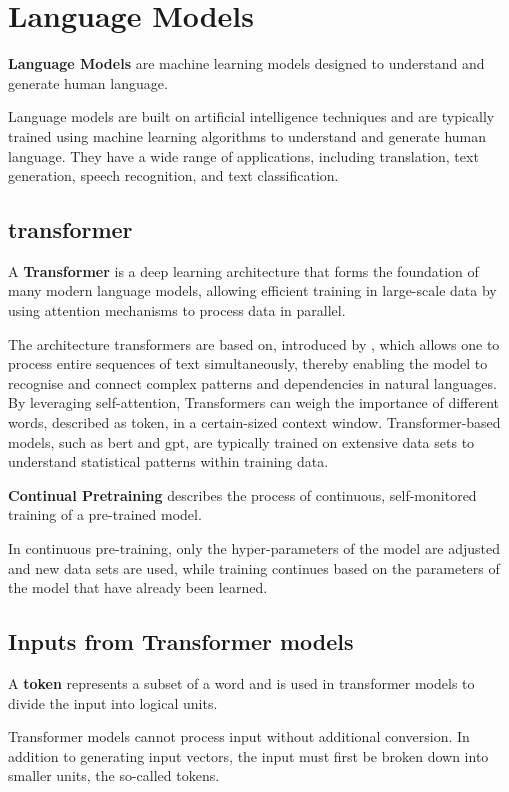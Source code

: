 \section{Language Models}\label{sec:language-models}

\begin{definition}\label{def:language-models}
    \textbf{Language Models} are machine learning models designed to understand and generate human language.
\end{definition}
Language models are built on artificial intelligence techniques and are typically trained using machine learning algorithms to understand and generate human language. 
They have a wide range of applications, including translation, text generation, speech recognition, and text classification.
\subsection{transformer}\label{transformer}

\begin{definition}\label{def:transformer}
    A \textbf{Transformer} is a deep learning architecture that forms the foundation of many modern language models, allowing efficient training in large-scale data by using attention mechanisms to process data in parallel.

\end{definition}
The architecture transformers are based on, introduced by \citet{vaswani2017attention}, which allows one to process entire sequences of text simultaneously, thereby enabling the model to recognise and connect complex patterns and dependencies in natural languages. 
By leveraging self-attention, Transformers can weigh the importance of different words, described as token, in a certain-sized context window. 
Transformer-based models, such as \ac{bert} and \ac{gpt}, are typically trained on extensive data sets to understand statistical patterns within training data.\citep{atallah2023impact}

\begin{definition}\label{def:continuous-pretraining}
    \textbf{Continual Pretraining} describes the process of continuous, self-monitored training of a pre-trained model.
\end{definition}
In continuous pre-training, only the hyper-parameters of the model are adjusted and new data sets are used, while training continues based on the parameters of the model that have already been learned.
\subsection{Inputs from Transformer models}
\begin{definition}\label{def:token}
    A \textbf{token} represents a subset of a word and is used in transformer models to divide the input into logical units.
\end{definition}
Transformer models cannot process input without additional conversion.
In addition to generating input vectors, the input must first be broken down into smaller units, the so-called tokens.
%
